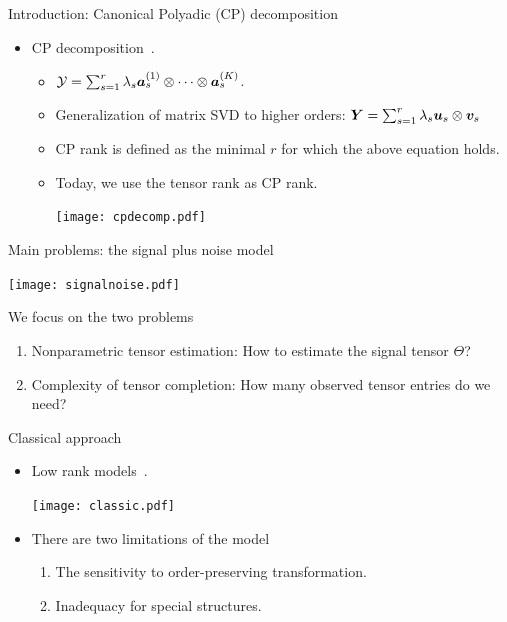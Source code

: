 \documentclass[10pt, mathserif]{beamer} %
\theoremstyle{definition}
\theoremstyle{plain}
\begin{document}
\begin{frame}{Introduction:  Canonical Polyadic (CP) decomposition}
\begin{itemize}
    \item CP decomposition~\citep{hitchcock1927expression}.
    \begin{itemize}
    \item $\mathcal{Y} = \sum_{s = 1}^r\lambda_s\bm{a}_s^{(1)}\otimes \cdots\otimes \bm{a}_s^{(K)}$.
    
    \item Generalization of matrix SVD to higher orders: $\bm Y = \sum_{s = 1}^r \lambda_s \bm u_s\otimes \bm{v}_s$
    \item CP rank is defined as the minimal $r$ for which the above equation holds.
    \item Today, we use the tensor rank as CP rank.
    \begin{center}
    \texttt{[image: cpdecomp.pdf]}
    \end{center}
    \end{itemize}
\end{itemize}
\end{frame}

\begin{frame}{Main problems: the signal plus noise model}
     \begin{center}
    \texttt{[image: signalnoise.pdf]}
    \end{center}
    We focus on the two problems
    \begin{enumerate}
        \item {\color{red}Nonparametric tensor estimation}: How to estimate the signal tensor $\Theta$?
        \item {\color{red}Complexity of tensor completion}: How many observed tensor entries do we need?
    \end{enumerate}
\end{frame}

\begin{frame}{Classical approach}
 \begin{itemize}
 \item Low rank models~\citep{jain2014provable,montanari2018spectral}.\\[.5cm]

    \begin{center}
    \texttt{[image: classic.pdf]}
    \end{center}

     \item There are two limitations of the model
     \begin{enumerate}
         \item The sensitivity to order-preserving transformation.
         \item Inadequacy for special structures.
     \end{enumerate}
 \end{itemize}
\end{frame}
\end{document}
